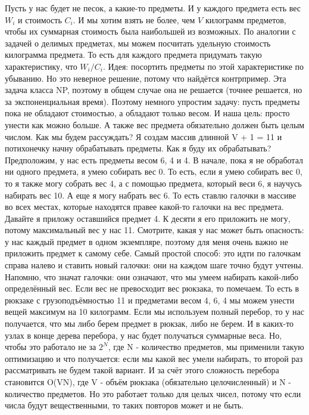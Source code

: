 \documentclass[12pt]{article}
\begin{document}
Пусть у нас будет не песок, а какие-то предметы. И у каждого предмета есть вес $W_i$ и стоимость $C_i$. И мы хотим взять не более, чем $V$ килограмм предметов, чтобы их суммарная стоимость была наибольшей из возможных. По аналогии с задачей о делимых предметах, мы можем посчитать удельную стоимость килограмма предмета. То есть для каждого предмета придумать такую характеристику, что $W_i/C_i$. Идея: посортить предметы по этой характеристике по убыванию. Но это неверное решение, потому что найдётся контрпример. Эта задача класса NP, поэтому в общем случае она не решается (точнее решается, но за экспоненциальная время). Поэтому немного упростим задачу: пусть предметы пока не обладают стоимостью, а обладают только весом. И наша цель: просто унести как можно больше. А также вес предмета обязательно должен быть целым числом. Как мы будем рассуждать? Я создам массив длинной V + 1 = 11 и потихонечку начну обрабатывать предметы. Как я буду их обрабатывать? Предположим, у нас есть предметы весом 6, 4 и 4. В начале, пока я не обработал ни одного предмета, я умею собирать вес 0. То есть, если я умею собирать вес 0, то я также могу собрать вес 4, а с помощью предмета, который веси 6, я научусь набирать вес 10. А еще я могу набрать вес 6. То есть ставлю галочки в массиве во всех местах, которые находятся правее какой-то галочки на вес предмета. Давайте я приложу оставшийся предмет 4. К десяти я его приложить не могу, потому максимальный вес у нас 11. Смотрите, какая у нас может быть опасность: у нас каждый предмет в одном экземпляре, поэтому для меня очень важно не приложить предмет к самому себе. Самый простой способ: это идти по галочкам справа налево и ставить новый галочки: они на каждом шаге точно будут учтены. Напомню, что значат галочки: они означают, что мы умеем набирать какой-либо определённый вес. Если вес не превосходит вес рюкзака, то помечаем. То есть в рюкзаке с грузоподъёмностью 11 и предметами весом 4, 6, 4 мы можем унести вещей максимум на 10 килограмм. Если мы используем полный перебор, то у нас получается, что мы либо берем предмет в рюкзак, либо не берем. И в каких-то узлах в конце дерева перебора, у нас будет получаться суммарные веса. Но, чтобы это работало не за $2^N$, где N - количество предметов, мы применили такую оптимизацию и что получается: если мы какой вес умели набирать, то второй раз рассматривать не будем такой вариант. И за счёт этого сложность перебора становится O(VN), где V - объём рюкзака (обязательно целочисленный) и N - количество предметов. Но это работает только для целых чисел, потому что если числа будут вещественными, то таких повторов может и не быть.
\end{document}
